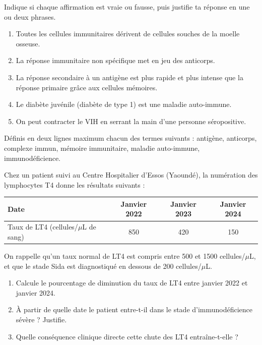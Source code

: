 \documentclass[11pt]{article}
\newcommand{\cle}[1]{{\popxbold\color{popdark}#1}}
\begin{document}
\begin{exercice}
Indique si chaque affirmation est vraie ou fausse, puis justifie ta réponse en une ou deux phrases.
\begin{enumerate}
\item Toutes les cellules immunitaires dérivent de cellules souches de la moelle osseuse.
\item La réponse immunitaire non spécifique met en jeu des anticorps.
\item La réponse secondaire à un antigène est plus rapide et plus intense que la réponse primaire grâce aux cellules mémoires.
\item Le diabète juvénile (diabète de type 1) est une maladie auto-immune.
\item On peut contracter le VIH en serrant la main d'une personne séropositive.
\end{enumerate}
\end{exercice}

\begin{exercice}
Définis en deux lignes maximum chacun des termes suivants : \cle{antigène}, \cle{anticorps}, \cle{complexe immun}, \cle{mémoire immunitaire}, \cle{maladie auto-immune}, \cle{immunodéficience}.
\end{exercice}

\begin{exercice}
Chez un patient suivi au Centre Hospitalier d'Essos (Yaoundé), la numération des lymphocytes T4 donne les résultats suivants :
\begin{center}
\begin{tabular}{|l|c|c|c|}
\hline
\rowcolor{popblueL} Date & Janvier 2022 & Janvier 2023 & Janvier 2024 \\
\hline
Taux de LT4 (cellules/$\mu$L de sang) & 850 & 420 & 150 \\
\hline
\end{tabular}
\end{center}
On rappelle qu'un taux normal de LT4 est compris entre 500 et \num{1500} cellules/$\mu$L, et que le stade Sida est diagnostiqué en dessous de 200 cellules/$\mu$L.
\begin{enumerate}
\item Calcule le pourcentage de diminution du taux de LT4 entre janvier 2022 et janvier 2024.
\item À partir de quelle date le patient entre-t-il dans le stade d'immunodéficience sévère ? Justifie.
\item Quelle conséquence clinique directe cette chute des LT4 entraîne-t-elle ?
\end{enumerate}
\end{exercice}
\end{document}
